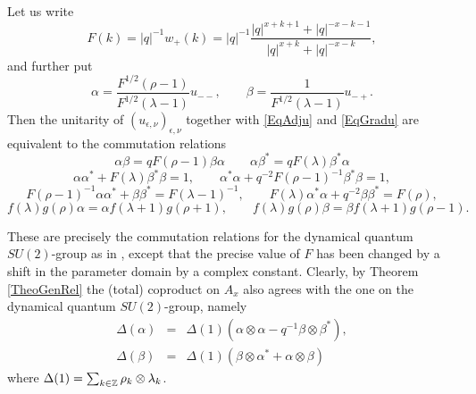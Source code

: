 


Let us write \[F(k) = |q|^{-1}w_+(k) =  |q|^{-1}\frac{|q|^{x+k+1}+|q|^{-x-k-1}}{|q|^{x+k}+|q|^{-x-k}},\] and further put\[\alpha = \frac{F^{1/2}(\rho-1)}{F^{1/2}(\lambda-1)}u_{--},\qquad \beta = \frac{1}{F^{1/2}(\lambda-1)}u_{-+}.\] Then the unitarity of $(u_{\epsilon,\nu})_{\epsilon,\nu}$ together with \eqref{EqAdju} and \eqref{EqGradu} are equivalent to the commutation relations \begin{equation}\label{EqqCom} \alpha \beta = qF(\rho-1)\beta\alpha \qquad \alpha\beta^* = qF(\lambda)\beta^*\alpha\end{equation} \begin{equation}\label{EqDet} \alpha\alpha^* +F(\lambda)\beta^*\beta = 1,\qquad \alpha^*\alpha+q^{-2}F(\rho-1)^{-1}\beta^*\beta = 1,\end{equation}\begin{equation*} F(\rho-1)^{-1}\alpha\alpha^* +\beta\beta^* = F(\lambda-1)^{-1},\qquad  F(\lambda)\alpha^*\alpha +q^{-2}\beta\beta^* = F(\rho),\end{equation*} \begin{equation}\label{EqGrad} f(\lambda)g(\rho)\alpha =
\alpha f(\lambda+1)g(\rho+1),\qquad f(\lambda)g(\rho)\beta = \beta f(\lambda+1)g(\rho-1).\end{equation}%

These are precisely the commutation relations for the dynamical quantum $SU(2)$-group as in \cite[Definition 2.6]{KoR1}, except that the precise value of $F$ has been changed by a shift in the parameter domain by a complex constant. Clearly, by Theorem \ref{TheoGenRel} the (total) coproduct on $A_x$ also agrees with the one on the dynamical quantum $SU(2)$-group, namely \begin{eqnarray*} \Delta(\alpha) &=& \Delta(1) (\alpha\otimes \alpha - q^{-1}\beta\otimes \beta^*),\\ \Delta(\beta) &=& \Delta(1)(\beta\otimes \alpha^* +\alpha\otimes \beta)\end{eqnarray*} where $\Delta(1) = \sum_{k\in \mathbb{Z}} \rho_k\otimes \lambda_k$.

